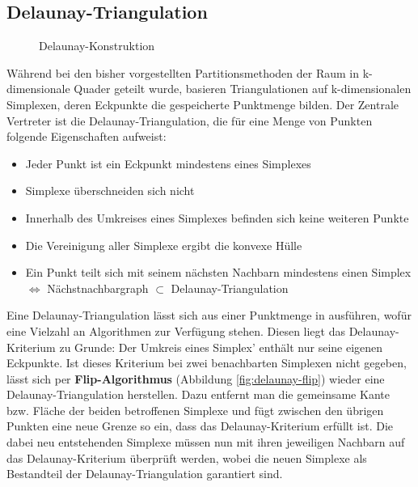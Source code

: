 \subsection{Delaunay-Triangulation}

\begin{figure}[bhpt]
  \centering
  \def\svgwidth{\textwidth}
  
  \caption[Delaunay-Konstruktion]{Delaunay-Konstruktion}
  \label{fig:delaunay}
\end{figure}

Während bei den bisher vorgestellten Partitionsmethoden der Raum in k-dimensionale Quader geteilt wurde, basieren Triangulationen auf k-dimensionalen Simplexen, deren Eckpunkte die gespeicherte Punktmenge bilden.
Der Zentrale Vertreter ist die Delaunay-Triangulation, die für eine Menge von Punkten folgende Eigenschaften aufweist:

\begin{itemize}
\item Jeder Punkt ist ein Eckpunkt mindestens eines Simplexes
\item Simplexe überschneiden sich nicht
\item Innerhalb des Umkreises eines Simplexes befinden sich keine weiteren Punkte
\item Die Vereinigung aller Simplexe ergibt die konvexe Hülle
\item Ein Punkt teilt sich mit seinem nächsten Nachbarn mindestens einen Simplex \\
$\Leftrightarrow$ Nächstnachbargraph $\subset$ Delaunay-Triangulation
\end{itemize}

Eine Delaunay-Triangulation lässt sich aus einer Punktmenge in  ausführen, wofür eine Vielzahl an Algorithmen zur Verfügung stehen. 
Diesen liegt das Delaunay-Kriterium zu Grunde:
Der Umkreis eines Simplex' enthält nur seine eigenen Eckpunkte.
Ist dieses Kriterium bei zwei benachbarten Simplexen nicht gegeben, lässt sich per \textbf{Flip-Algorithmus} (Abbildung \ref{fig:delaunay-flip}) wieder eine Delaunay-Triangulation herstellen.
Dazu entfernt man die gemeinsame Kante bzw. Fläche der beiden betroffenen Simplexe und fügt zwischen den übrigen Punkten eine neue Grenze so ein, dass das Delaunay-Kriterium erfüllt ist.
Die dabei neu entstehenden Simplexe müssen nun mit ihren jeweiligen Nachbarn auf das Delaunay-Kriterium überprüft werden, wobei die neuen Simplexe als Bestandteil der Delaunay-Triangulation garantiert sind.


